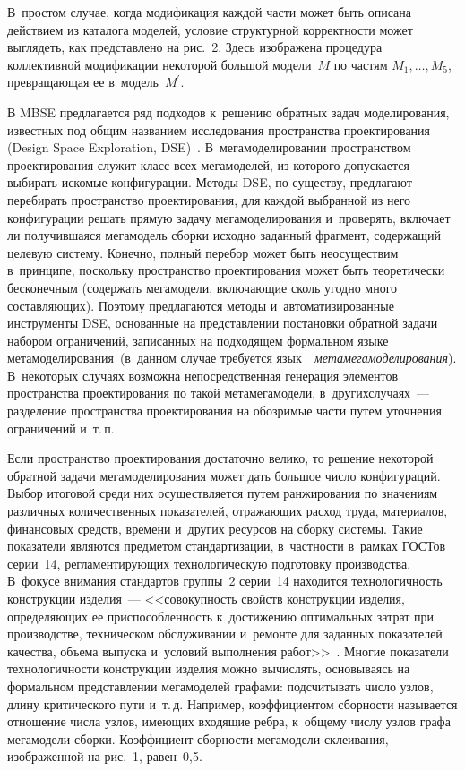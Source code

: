 \begin{multicols}{2}
В~простом случае, когда модификация 
каж\-дой части может быть описана действием из каталога моделей, условие 
структурной кор\-рект\-ности может выглядеть, как представлено на рис.~2. Здесь 
изображена процедура коллективной модификации некоторой большой 
модели~$M$ по частям $M_1, \ldots ,M_5$, превращающая ее 
в~модель~$M^\prime$.


   В MBSE предлагается ряд подходов к~решению обратных задач 
моделирования, известных под общим названием исследования пространства 
проектирования (Design Space Exploration, DSE)~\cite{10-kov}. 
В~мегамоделировании пространством проектирования служит класс всех 
мегамоделей, из которого допускается выбирать искомые конфигурации. 
Методы DSE, по существу, предлагают перебирать пространство 
проектирования, для каждой выбранной из него конфигурации решать прямую 
задачу мегамоделирования и~проверять, включает ли получившаяся мегамодель 
сборки исходно заданный фрагмент, содержащий целевую сис\-те\-му. Конечно, 
полный перебор может быть неосуществим в~принципе, поскольку 
пространство проектирования может быть теоретически бесконечным 
(содержать мегамодели, включающие сколь угодно много составляющих). 
Поэтому предлагаются методы и~автоматизированные инструменты DSE, 
основанные на представлении постановки обратной задачи набором 
ограничений, записанных на подходящем формальном языке 
метамоделирования~\cite{11-kov}\linebreak (в~данном случае требуется язык\ \ 
\textit{метамегамоделирования}). В~некоторых случаях возможна 
непосредственная генерация элементов пространства проектирования по такой 
метамегамодели, в~других\linebreak случаях~--- разделение пространства проектирования 
на обозримые части путем уточнения ограничений и~т.\,п.
   
   Если пространство проектирования достаточно велико, то решение 
некоторой обратной задачи мегамоделирования может дать большое число 
конфигураций. Выбор итоговой среди них осуществляется путем ранжирования 
по значениям различных количественных показателей, отражающих расход 
труда, материалов, финансовых средств, времени и~других ресурсов на сборку 
сис\-те\-мы. Такие показатели являются предметом стандартизации, в~частности 
в~рамках ГОСТов серии~14, регламентирующих технологическую подготовку 
производства. В~фокусе внимания стандартов группы~2 серии~14 находится 
технологичность конструкции изделия~--- <<совокупность свойств 
конструкции изделия, определяющих ее приспособленность к~достижению 
оптимальных затрат при производстве, техническом обслуживании и~ремонте 
для заданных показателей качества, объема выпуска и~условий выполнения 
работ>>~\cite{12-kov}. Многие показатели технологичности конструкции 
изделия можно вычислять, основываясь на формальном пред\-став\-ле\-нии 
мегамоделей графами: подсчитывать число узлов, длину критического пути 
и~т.\,д. Например, коэффициентом сборности называется отношение числа 
узлов, имеющих входящие ребра, к~общему числу узлов графа мегамодели 
сборки. Коэффициент сборности мегамодели склеивания, изображенной на 
рис.~1, равен~0,5.
   

\end{multicols}

